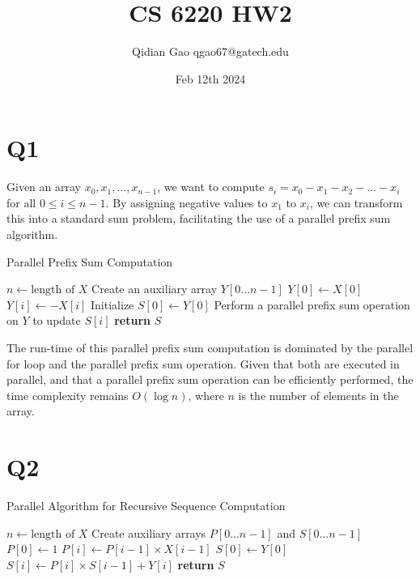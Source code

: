 \documentclass{article}
\title{CS 6220 HW2}
\author{Qidian Gao qgao67@gatech.edu}
\date{Feb 12th 2024}
\begin{document}
\maketitle

\section{Q1}
Given an array \(x_0, x_1, \ldots, x_{n-1}\), we want to compute \(s_i = x_0 - x_1 - x_2 - \ldots - x_i\) for all \(0 \leq i \leq n-1\). By assigning negative values to \(x_1\) to \(x_i\), we can transform this into a standard sum problem, facilitating the use of a parallel prefix sum algorithm.

\begin{algorithm}
\caption{Parallel Prefix Sum Computation}
\begin{algorithmic}[1]
    \State $n \gets \text{length of } X$
    \State Create an auxiliary array $Y[0\ldots n-1]$
    \State $Y[0] \gets X[0]$
        \State $Y[i] \gets -X[i]$ 
    \EndFor
    \State Initialize $S[0] \gets Y[0]$
        \State Perform a parallel prefix sum operation on $Y$ to update $S[i]$
    \EndFor
    \State \textbf{return} $S$
\EndFunction
\end{algorithmic}
\end{algorithm}

The run-time of this parallel prefix sum computation is dominated by the parallel for loop and the parallel prefix sum operation. Given that both are executed in parallel, and that a parallel prefix sum operation can be efficiently performed, the time complexity remains \(O(\log n)\), where \(n\) is the number of elements in the array.

\section{Q2}

\begin{algorithm}[H]
\caption{Parallel Algorithm for Recursive Sequence Computation}
\begin{algorithmic}[1]
    \State $n \gets \text{length of } X$
    \State Create auxiliary arrays $P[0\ldots n-1]$ and $S[0\ldots n-1]$
    \State $P[0] \gets 1$
        \State $P[i] \gets P[i-1] \times X[i-1]$
    \EndFor
    \State $S[0] \gets Y[0]$
        \State $S[i] \gets P[i] \times S[i-1] + Y[i]$
    \EndFor
    \State \textbf{return} $S$
\EndFunction
\end{algorithmic}
\end{algorithm}
\end{document}
